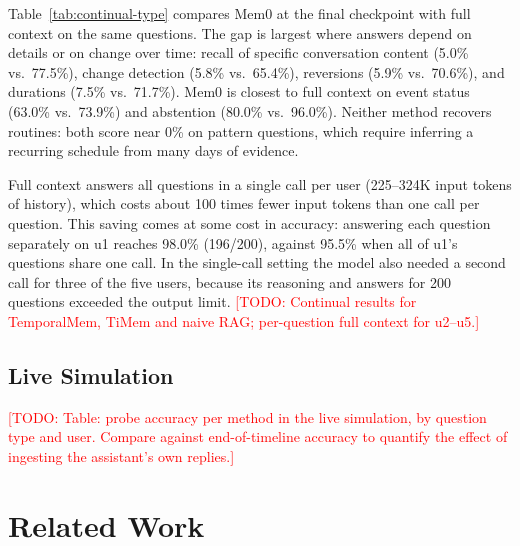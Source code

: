 \documentclass[11pt]{article}
\newcommand{\ours}{TemporalMem}
\newcommand{\todo}[1]{\textcolor{red}{[TODO: #1]}}
\begin{document}
Table~\ref{tab:continual-type} compares Mem0 at the final checkpoint with full context on the same questions. The gap is largest where answers depend on details or on change over time: recall of specific conversation content (5.0\% vs.\ 77.5\%), change detection (5.8\% vs.\ 65.4\%), reversions (5.9\% vs.\ 70.6\%), and durations (7.5\% vs.\ 71.7\%). Mem0 is closest to full context on event status (63.0\% vs.\ 73.9\%) and abstention (80.0\% vs.\ 96.0\%). Neither method recovers routines: both score near 0\% on pattern questions, which require inferring a recurring schedule from many days of evidence.

Full context answers all questions in a single call per user (225--324K input tokens of history), which costs about 100 times fewer input tokens than one call per question. This saving comes at some cost in accuracy: answering each question separately on u1 reaches 98.0\% (196/200), against 95.5\% when all of u1's questions share one call. In the single-call setting the model also needed a second call for three of the five users, because its reasoning and answers for 200 questions exceeded the output limit. \todo{Continual results for \ours, TiMem and naive RAG; per-question full context for u2--u5.}

\subsection{Live Simulation}

\todo{Table: probe accuracy per method in the live simulation, by question type and user. Compare against end-of-timeline accuracy to quantify the effect of ingesting the assistant's own replies.}

\section{Related Work}
\end{document}

